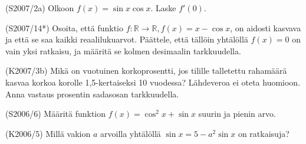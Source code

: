 \begin{tehtava} (S2007/2a)
	Olkoon $f(x)=\sin x\cos x$. Laske $f'(0)$.
\end{tehtava}

\begin{tehtava} (S2007/14*)
	Osoita, että funktio $f \colon \mathbb{R}\to\mathbb{R}, f(x)=x-\cos x$, on aidosti kasvava ja 
	että se saa kaikki reaalilukuarvot. Päättele, että tällöin yhtälöllä $f(x)=0$ on vain yksi 
	ratkaisu, ja määritä se kolmen desimaalin tarkkuudella.
\end{tehtava}

\begin{tehtava} (K2007/3b)
	Mikä on vuotuinen korkoprosentti, jos tilille talletettu rahamäärä kasvaa korkoa korolle 
	1,5-kertaiseksi 10 vuodessa? Lähdeveroa ei oteta huomioon. Anna vastaus prosentin sadasosan 
	tarkkuudella.
\end{tehtava}

\begin{tehtava} (S2006/6)
	Määritä funktion $f(x)=\cos^2x+\sin x$ suurin ja pienin arvo.
\end{tehtava}

\begin{tehtava} (K2006/5)
	Millä vakion $a$ arvoilla yhtälöllä $\sin x=5-a^2\sin x$ on ratkaisuja?
\end{tehtava}
